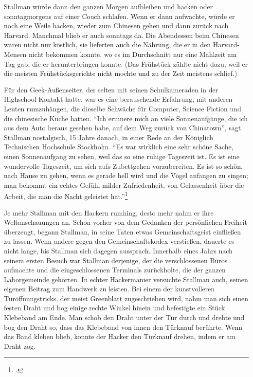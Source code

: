 Stallman würde dann den ganzen Morgen aufbleiben und hacken oder sonntagmorgens auf einer Couch schlafen. Wenn er dann aufwachte, würde er noch eine Weile hacken, wieder zum Chinesen gehen und dann zurück nach Harvard. Manchmal blieb er auch sonntags da. Die Abendessen beim Chinesen waren nicht nur köstlich, sie lieferten auch die Nährung, die er in den Harvard-Mensen nicht bekommen konnte, wo es im Durchschnitt nur eine Mahlzeit am Tag gab, die er herunterbringen konnte. (Das Frühstück zählte nicht dazu, weil er die meisten Frühstücksgerichte nicht mochte und zu der Zeit meistens schlief.)

Für den Geek-Außenseiter, der selten mit seinen Schulkameraden in der Highschool Kontakt hatte, war es eine berauschende Erfahrung, mit anderen Leuten rumzuhängen, die dieselbe Schwäche für Computer, Science Fiction und die chinesische Küche hatten. "`Ich erinnere mich an viele Sonnenaufgänge, die ich aus dem Auto heraus gesehen habe, auf dem Weg zurück von Chinatown"', sagt Stallman nostalgisch, 15 Jahre danach, in einer Rede an der Königlich Technischen Hochschule Stockholm. "`Es war wirklich eine sehr schöne Sache, einen Sonnenaufgang zu sehen, weil das so eine ruhige Tageszeit ist. Es ist eine wundervolle Tageszeit, um sich aufs Zubettgehen vorzubereiten. Es ist so schön, nach Hause zu gehen, wenn es gerade hell wird und die Vögel anfangen zu singen; man bekommt ein echtes Gefühl milder Zufriedenheit, von Gelassenheit über die Arbeit, die man die Nacht geleistet hat."'\footcite[Vgl.][]{rmskth}

Je mehr Stallman mit den Hackern rumhing, desto mehr nahm er ihre Weltanschauungen an. Schon vorher von dem Gedanken der persönlichen Freiheit überzeugt, begann Stallman, in seine Taten etwas Gemeinschaftsgeist einfließen zu lassen. Wenn andere gegen den Gemeinschaftskodex verstießen, dauerte es nicht lange, bis Stallman sich dagegen aussprach. Innerhalb eines Jahrs nach seinem ersten Besuch war Stallman derjenige, der die verschlossenen Büros aufmachte und die eingeschlossenen Terminals zurückholte, die der ganzen Laborgemeinde gehörten. In echter Hackermanier versuchte Stallman auch, seinen eigenen Beitrag zum Handwerk zu leisten. Bei einem der kunstvolleren Türöffnungstricks, der meist Greenblatt zugeschrieben wird, nahm man sich einen festen Draht und bog einige rechte Winkel hinein und befestigte ein Stück Klebeband am Ende. Man schob den Draht unter der Tür durch und drehte und bog den Draht so, dass das Klebeband von innen den Türknauf berührte. Wenn das Band kleben blieb, konnte der Hacker den Türknauf drehen, indem er am Draht zog.

